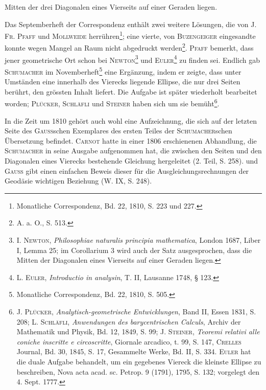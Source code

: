 Mitten der drei Diagonalen eines Vierseits auf einer Geraden liegen.
\par
Das Septemberheft der Correspondenz enthält zwei weitere Lösungen, die
von \textsc{J. Fr. Pfaff} und \textsc{Mollweide} herrühren\footnote{Monatliche Correspondenz, Bd. 22, 1810, S. 223 und 227.}; eine vierte, von \textsc{Buzengeiger}
eingesandte konnte wegen Mangel an Raum nicht abgedruckt werden\footnote{A. a. O., S. 513.}. \textsc{Pfaff}
bemerkt, dass jener geometrische Ort schon bei \textsc{Newton}\footnote{I. \textsc{Newton}, \textit{Philosophiae naturalis principia mathematica}, London 1687, Liber I, Lemma 25; im Corollarium 3 wird auch der Satz ausgesprochen, dass die Mitten der Diagonalen eines Vierseits auf einer Geraden liegen.} und \textsc{Euler}\footnote{L. \textsc{Euler}, \textit{Introductio in analysin}, T. II, Lausanne 1748, § 123.} zu
finden sei. Endlich gab \textsc{Schumacher} im Novemberheft\footnote{Monatliche Correspondenz, Bd. 22, 1810, S. 505.} eine Ergänzung,
indem er zeigte, dass unter Umständen eine innerhalb des Vierecks liegende
Ellipse, die nur drei Seiten berührt, den grössten Inhalt liefert. Die Aufgabe
ist später wiederholt bearbeitet worden; \textsc{Plücker}, \textsc{Schläfli} und \textsc{Steiner} haben
sich um sie bemüht\footnote{J. \textsc{Plücker}, \textit{Analytisch-geometrische Entwicklungen}, Band II, Essen 1831, S. 208; L. \textsc{Schläfli}, \textit{Anwendungen des barycentrischen Calculs}, Archiv der Mathematik und Physik, Bd. 12, 1849, S. 99; J. \textsc{Steiner}, \textit{Teoremi relativi alle coniche inscritte e circoscritte}, Giornale arcadico, t. 99, S. 147, \textsc{Crelles} Journal, Bd. 30, 1845, S. 17, Gesammelte Werke, Bd. II, S. 334. \textsc{Euler} hat die duale Aufgabe behandelt, um ein gegebenes Viereck die kleinste Ellipse zu beschreiben, Nova acta acad. sc. Petrop. 9 (1791), 1795, S. 132; vorgelegt den 4. Sept. 1777.}.
\par
In die Zeit um 1810 gehört auch wohl eine Aufzeichnung, die sich auf
der letzten Seite des \textsc{Gauss}schen Exemplares des ersten Teiles der \textsc{Schumacher}schen
Übersetzung befindet. \textsc{Carnot} hatte in einer 1806 erschienenen Abhandlung,
die \textsc{Schumacher} in seine Ausgabe aufgenommen hat, die zwischen
den Seiten und den Diagonalen eines Vierecks bestehende Gleichung
\clearpage{}\setcounter{footnote}{0}
\noindent hergeleitet (2. Teil, S. 258). und \textsc{Gauss} gibt einen einfachen Beweis dieser für die
Ausgleichungsrechnungen der Geodäsie wichtigen Beziehung (W. IX, S. 248).
